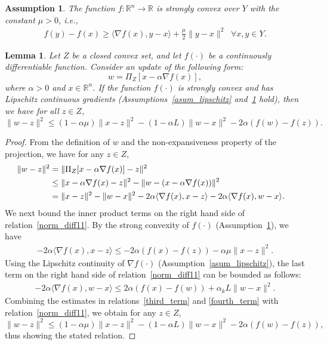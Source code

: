 \documentclass[10pt,a4paper]{amsart}
\newtheorem{assumption}{Assumption}
\newtheorem{lemma}{Lemma}
\def\a{\alpha}
\def\la{\langle}
\def\ra{\rangle}
\def\re{\mathbb{R}}
\begin{document}
\begin{assumption}\label{asum_strong_convex}
    The function $f:\re^n\to\re$ is strongly convex
   over $Y$ with the constant $\mu>0$, i.e.,
   \begin{align}
       f(y)-f(x)\ge \la \nabla f(x),y-x\ra+\frac{\mu}{2}\|y-x\|^2 \;\; \forall x, y \in Y . \nonumber
   \end{align}
\end{assumption}

\begin{lemma}\label{lem-elem-grad} 
     Let $Z$ be a closed convex set, and let 
     $f(\cdot)$ be a continuously differentiable function. Consider an update of the following form:
     \[w=\Pi_Z[x-\a\nabla f(x)],\]
     where $\a>0$ and $x\in\re^n$. If the function $f(\cdot)$ is strongly convex and has Lipschitz continuous gradients (Assumptions~\ref{asum_lipschitz} and~\ref{asum_strong_convex} hold), then 
     we have for all $z\in Z$,
     \[\|w - z\|^2 \leq (1-\a \mu) \| x -z \|^2 - (1 - \a L) \| w - x\|^2 - 2 \a (f(w) - f(z)).\]
     \end{lemma}

 \begin{proof}
   From the definition of $w$ and the non-expansiveness property of the projection,  we have for any $z \in Z$,
    \begin{align}\label{norm_diff11}
        \|w - z\|^2 &= \| \Pi_Z[x - \a \nabla f(x)] - z\|^2\cr
        &\leq \| x - \a \nabla f(x) - z\|^2 - \| w - (x - \a \nabla f(x)) \|^2 \cr
        & = \| x -z \|^2 - \| w - x \|^2 
        - 2 \a\la \nabla f(x), x -z \ra 
        - 2 \a \la \nabla f(x), w - x \ra.
    \end{align}
    We next bound the inner product terms on the right hand side of relation~\eqref{norm_diff11}. By the strong convexity of $f(\cdot)$ (Assumption~\ref{asum_strong_convex}),
    we have
    \begin{align}\label{third_term}
        - 2 \a \la \nabla f(x), x -z \ra \leq - 2 \a (f(x) - f(z)) - \a \mu \| x - z \|^2 .
    \end{align}
    Using the Lipschitz continuity of $\nabla f(\cdot)$ (Assumption~\ref{asum_lipschitz}), the last term on the right hand side of relation~\eqref{norm_diff11} can be bounded as follows:
    \begin{align}\label{fourth_term}
        - 2 \a \la \nabla f(x), w - x \ra 
        \leq 2 \a (f(x) - f(w)) + \a_k L \|w - x \|^2 .
    \end{align}
    Combining the estimates in relations~\eqref{third_term} and \eqref{fourth_term} with relation~\eqref{norm_diff11}, we obtain for any $z\in Z$,
    \[\|w - z\|^2 \leq (1-\a \mu) \| x -z\|^2 - (1 - \a L) \| w - x \|^2 - 2 \a (f(w) - f(z)),\]
    thus showing the stated relation.
\end{proof}
\end{document}

